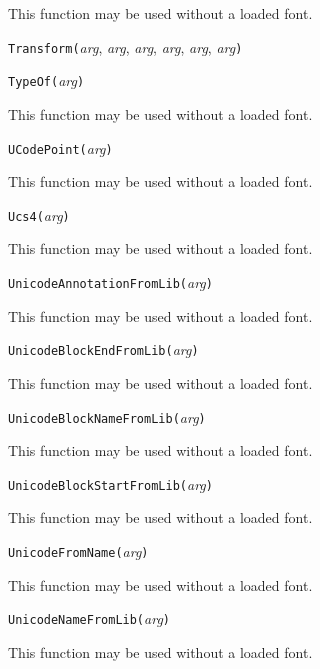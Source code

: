 This function may be used without a loaded font.


\noindent\texttt{Transform(}\textit{arg}, \textit{arg}, \textit{arg}, \textit{arg}, \textit{arg}, \textit{arg}\texttt{)}


\noindent\texttt{TypeOf(}\textit{arg}\texttt{)}

This function may be used without a loaded font.


\noindent\texttt{UCodePoint(}\textit{arg}\texttt{)}

This function may be used without a loaded font.


\noindent\texttt{Ucs4(}\textit{arg}\texttt{)}

This function may be used without a loaded font.


\noindent\texttt{UnicodeAnnotationFromLib(}\textit{arg}\texttt{)}

This function may be used without a loaded font.


\noindent\texttt{UnicodeBlockEndFromLib(}\textit{arg}\texttt{)}

This function may be used without a loaded font.


\noindent\texttt{UnicodeBlockNameFromLib(}\textit{arg}\texttt{)}

This function may be used without a loaded font.


\noindent\texttt{UnicodeBlockStartFromLib(}\textit{arg}\texttt{)}

This function may be used without a loaded font.


\noindent\texttt{UnicodeFromName(}\textit{arg}\texttt{)}

This function may be used without a loaded font.


\noindent\texttt{UnicodeNameFromLib(}\textit{arg}\texttt{)}

This function may be used without a loaded font.

